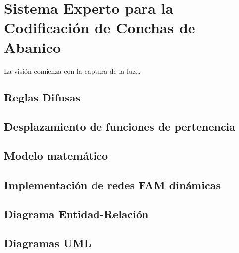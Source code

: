 \chapter{Sistema Experto para la Codificación de Conchas de Abanico}
\label{cap:sistemaexperto}
La visión comienza con la captura de la luz\ldots

\section{Reglas Difusas}
\section{Desplazamiento de funciones de pertenencia}
\section{Modelo matemático}
\section{Implementación de redes FAM dinámicas}
\section{Diagrama Entidad-Relación}
\section{Diagramas UML}


